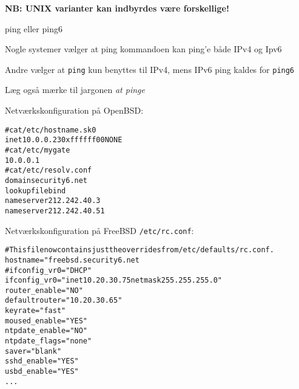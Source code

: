 \documentclass[Screen16to9,17pt,footrule]{foils}
\begin{document}
\vskip 1cm

\centerline{\bf NB: UNIX varianter kan indbyrdes være forskellige!}




\vskip 1cm
\centerline{ping eller ping6}

\begin{list1}
\item Nogle systemer vælger at ping kommandoen kan ping'e både IPv4 og Ipv6
\item Andre vælger at \verb+ping+ kun benyttes til IPv4, mens IPv6 ping kaldes for \verb+ping6+
\item Læg også mærke til jargonen \emph{at pinge}
\end{list1}



Netværkskonfiguration på OpenBSD:
\begin{alltt}
# cat /etc/hostname.sk0
inet 10.0.0.23 0xffffff00 NONE
# cat /etc/mygate
10.0.0.1
# cat /etc/resolv.conf
domain security6.net
lookup file bind
nameserver 212.242.40.3
nameserver 212.242.40.51
\end{alltt}


Netværkskonfiguration på FreeBSD \verb+/etc/rc.conf+:
\begin{alltt}
\small
# This file now contains just the overrides from /etc/defaults/rc.conf.
hostname="freebsd.security6.net
#ifconfig_vr0="DHCP"
ifconfig_vr0="inet 10.20.30.75 netmask 255.255.255.0"
router_enable="NO"
defaultrouter="10.20.30.65"
keyrate="fast"
moused_enable="YES"
ntpdate_enable="NO"
ntpdate_flags="none"
saver="blank"
sshd_enable="YES"
usbd_enable="YES"
...
\end{alltt}






\end{document}
